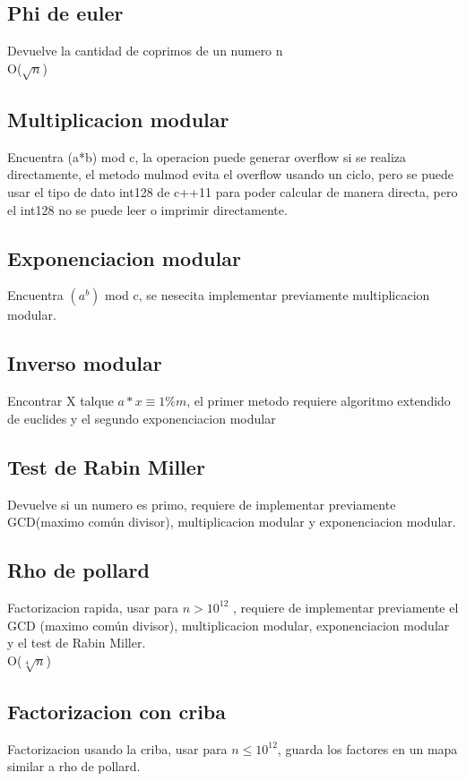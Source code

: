 \documentclass[10pt,landscape,twocolumn,a4paper,notitlepage]{article}
\newcommand\cppfile[2][]{

}
\begin{document}
			\subsection{Phi de euler}
			Devuelve la cantidad de coprimos de un numero n\\
			O($\sqrt{n}$) 
			\cppfile[5-14]{matematicas/phi_de_euler.cpp}
			\subsection{Multiplicacion modular}
			Encuentra (a*b) mod c, la operacion puede generar overflow
				si se realiza directamente, el metodo mulmod evita el overflow usando un
				ciclo, pero se puede usar el tipo de dato int128 de c++11 para poder calcular
				de manera directa, pero el int128 no se puede leer o imprimir directamente.
			\cppfile[5-26]{matematicas/multiplicacion_modular.cpp}
			\subsection{Exponenciacion modular}
			Encuentra $(a^b)$ mod c, se nesecita implementar previamente multiplicacion modular.
			\cppfile[16-20]{matematicas/exp_modular.cpp}
			\subsection{Inverso modular}
			Encontrar X talque $a*x \equiv 1\% m$, el primer metodo requiere algoritmo extendido de euclides y el 
			segundo exponenciacion modular
			\cppfile[34-43]{matematicas/inverso_multiplicativo_modular.cpp}
			\subsection{Test de Rabin Miller}
			Devuelve si un numero es primo, requiere de implementar previamente GCD(maximo común divisor),
			multiplicacion modular y exponenciacion modular.
			\cppfile[27-50]{matematicas/test_de_rabin_miller.cpp}
			\subsection{Rho de pollard}
			Factorizacion rapida, usar para $n > 10^{12}$ , requiere de implementar previamente el GCD
			(maximo común divisor), multiplicacion modular,	exponenciacion modular y el test de Rabin Miller.\\
			O($\sqrt[4]{n}$)
			\cppfile[52-77]{matematicas/rho_de_pollard.cpp}
			\subsection{Factorizacion con criba}
			Factorizacion usando la criba, usar para $n \leq 10^{12}$, guarda los factores en un mapa 
			similar a rho de pollard.
			\cppfile[10-48]{matematicas/factorizacion_criba.cpp}
\end{document}
